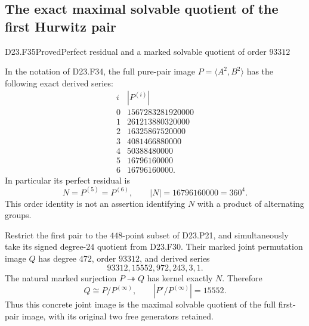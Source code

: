 \subsection{The exact maximal solvable quotient of the first Hurwitz pair}

\begin{statement}{D23.F35}{Proved}{Perfect residual and a marked solvable quotient of order $93312$}
\end{statement}
In the notation of D23.F34, the full pure-pair image
$P=\langle A^2,B^2\rangle$ has the following exact derived series:
\[
\begin{array}{c|r}
 i&|P^{(i)}|\\\hline
0&1567283281920000\\
1&261213880320000\\
2&16325867520000\\
3&4081466880000\\
4&50388480000\\
5&16796160000\\
6&16796160000.
\end{array}                                               \tag{D23.F35.1}
\]
In particular its perfect residual is
\[
 N=P^{(5)}=P^{(6)},\qquad |N|=16796160000=360^4.
\]
This order identity is not an assertion identifying $N$ with a
product of alternating groups.

Restrict the first pair to the $448$-point subset of D23.P21, and
simultaneously take its signed degree-$24$ quotient from D23.F30.
Their marked joint permutation image $Q$ has degree $472$, order
$93312$, and derived series
\[
               93312,15552,972,243,3,1.                  \tag{D23.F35.2}
\]
The natural marked surjection $P\twoheadrightarrow Q$ has kernel
exactly $N$. Therefore
\[
                Q\cong P/P^{(\infty)},\qquad
                |P'/P^{(\infty)}|=15552.
\]
Thus this concrete joint image is the maximal solvable quotient of
the full first-pair image, with its original two free generators
retained.

